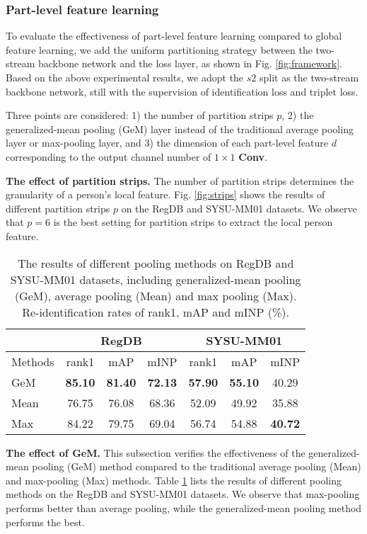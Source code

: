 \documentclass[journal]{IEEEtran}
\begin{document}
\subsubsection{Part-level feature learning}
\label{sssec:pfl}
To evaluate the effectiveness of part-level feature learning compared to global feature learning, we add the uniform partitioning strategy between the two-stream backbone network and the loss layer, as shown in Fig. \ref{fig:framework}.
Based on the above experimental results, we adopt the $s2$ split as the two-stream backbone network, still with the supervision of identification loss and triplet loss.

Three points are considered: 1) the number of partition strips $p$, 2) the generalized-mean pooling (GeM) layer instead of the traditional average pooling layer or max-pooling layer, and 3) the dimension of each part-level feature $d$ corresponding to the output channel number of $1 \times 1$ \textbf{Conv}.


\textbf{The effect of partition strips.} The number of partition strips determines the granularity of a person's local feature. Fig. \ref{fig:strips} shows the results of different partition strips $p$ on the RegDB and SYSU-MM01 datasets. We observe that $p=6$ is the best setting for partition strips to extract the local person feature.


\begin{table}
\caption{The results of different pooling methods on RegDB and SYSU-MM01 datasets, including generalized-mean pooling (GeM), average pooling (Mean) and max pooling (Max). Re-identification rates of rank1, mAP and mINP (\%).}
\label{tab:pool}
  \centering
\begin{tabular}{l|c|c|c|c|c|c}
   \toprule[2pt]
    & \multicolumn{3}{c|}{RegDB} & \multicolumn{3}{c}{SYSU-MM01}\\ \hline
    Methods & rank1 & mAP & mINP & rank1 & mAP & mINP \\ \toprule[1pt]
    GeM & \textbf{85.10} & \textbf{81.40} & \textbf{72.13} & \textbf{57.90} & \textbf{55.10} & 40.29 \\
    Mean &  76.75 & 76.08 & 68.36 & 52.09 & 49.92 & 35.88 \\
    Max & 84.22 & 79.75 & 69.04 & 56.74 & 54.88 & \textbf{40.72} \\ \toprule[2pt]
  \end{tabular}
\end{table}

\textbf{The effect of GeM.} This subsection verifies the effectiveness of the generalized-mean pooling (GeM) method compared to the traditional average pooling (Mean) and max-pooling (Max) methods. Table \ref{tab:pool} lists the results of different pooling methods on the RegDB and SYSU-MM01 datasets. We observe that max-pooling performs better than average pooling, while the generalized-mean pooling method performs the best.
\end{document}
